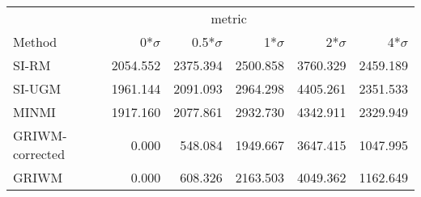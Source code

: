
\begin{tabular}{lrrrrr}
\toprule
\multicolumn{1}{c}{ } & \multicolumn{4}{c}{metric} \\
\cmidrule(l{3pt}r{3pt}){2-5}
Method & 0*$\sigma$ & 0.5*$\sigma$ & 1*$\sigma$ & 2*$\sigma$ & 4*$\sigma$\\
\midrule
SI-RM & 2054.552 & 2375.394 & 2500.858 & 3760.329 & 2459.189\\
SI-UGM & 1961.144 & 2091.093 & 2964.298 & 4405.261 & 2351.533\\
MINMI & 1917.160 & 2077.861 & 2932.730 & 4342.911 & 2329.949\\
GRIWM-corrected & 0.000 & 548.084 & 1949.667 & 3647.415 & 1047.995\\
GRIWM & 0.000 & 608.326 & 2163.503 & 4049.362 & 1162.649\\
\bottomrule
\end{tabular}
